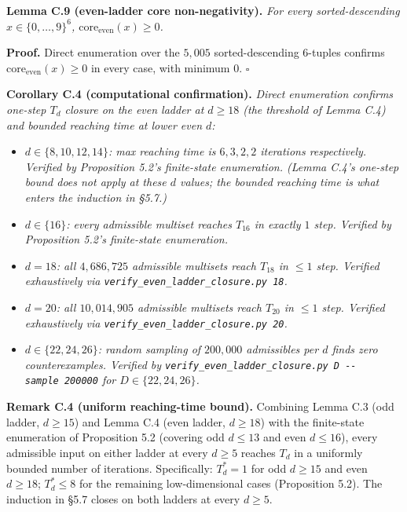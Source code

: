 \documentclass[11pt,letterpaper]{article}
\providecommand{\tightlist}{%
  \setlength{\itemsep}{0pt}\setlength{\parskip}{0pt}}
\theoremstyle{paperstyle}
\theoremstyle{paperstyledef}
\theoremstyle{paperstylerem}
\begin{document}
\textbf{Lemma C.9 (even-ladder core non-negativity).} \emph{For every
sorted-descending \(x \in \{0, \ldots, 9\}^6\),
\(\mathrm{core}_{\mathrm{even}}(x) \geq 0\).}

\textbf{Proof.} Direct enumeration over the \(5{,}005\)
sorted-descending 6-tuples confirms
\(\mathrm{core}_{\mathrm{even}}(x) \geq 0\) in every case, with minimum
\(0\). \(\square\)

\textbf{Corollary C.4 (computational confirmation).} \emph{Direct
enumeration confirms one-step \(T_d\) closure on the even ladder at
\(d \geq 18\) (the threshold of Lemma C.4) and bounded reaching time at
lower even \(d\):}

\begin{itemize}
\tightlist
\item
  \emph{\(d \in \{8, 10, 12, 14\}\): max reaching time is \(6, 3, 2, 2\)
  iterations respectively. Verified by Proposition 5.2's finite-state
  enumeration. (Lemma C.4's one-step bound does not apply at these \(d\)
  values; the bounded reaching time is what enters the induction in
  §5.7.)}
\item
  \emph{\(d \in \{16\}\): every admissible multiset reaches \(T_{16}\)
  in exactly \(1\) step. Verified by Proposition 5.2's finite-state
  enumeration.}
\item
  \emph{\(d = 18\): all \(4{,}686{,}725\) admissible multisets reach
  \(T_{18}\) in \(\leq 1\) step. Verified exhaustively via
  \texttt{verify\_even\_ladder\_closure.py\ 18}.}
\item
  \emph{\(d = 20\): all \(10{,}014{,}905\) admissible multisets reach
  \(T_{20}\) in \(\leq 1\) step. Verified exhaustively via
  \texttt{verify\_even\_ladder\_closure.py\ 20}.}
\item
  \emph{\(d \in \{22, 24, 26\}\): random sampling of \(200{,}000\)
  admissibles per \(d\) finds zero counterexamples. Verified by
  \texttt{verify\_even\_ladder\_closure.py\ D\ -\/-sample\ 200000} for
  \(D \in \{22, 24, 26\}\).}
\end{itemize}

\textbf{Remark C.4 (uniform reaching-time bound).} Combining Lemma C.3
(odd ladder, \(d \geq 15\)) and Lemma C.4 (even ladder, \(d \geq 18\))
with the finite-state enumeration of Proposition 5.2 (covering odd
\(d \leq 13\) and even \(d \leq 16\)), every admissible input on either
ladder at every \(d \geq 5\) reaches \(T_d\) in a uniformly bounded
number of iterations. Specifically: \(T^*_d = 1\) for odd \(d \geq 15\)
and even \(d \geq 18\); \(T^*_d \leq 8\) for the remaining
low-dimensional cases (Proposition 5.2). The induction in §5.7 closes on
both ladders at every \(d \geq 5\).
\end{document}
